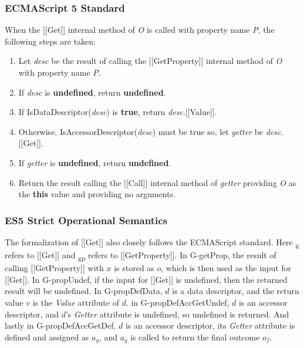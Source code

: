 \documentclass[a4paper,11pt,twoside]{report}
\begin{document}
\subsubsection{ECMAScript 5 Standard}\label{sec:getstandard}
When the [[Get]] internal method of \textit{O} is called with property name \textit{P}, the following steps are taken:
\begin{enumerate}
\item Let \textit{desc} be the result of calling the [[GetProperty]] internal method of \textit{O} with property name \textit{P}.
\item If \textit{desc} is \textbf{undefined}, return \textbf{undefined}.
\item If IsDataDescriptor(\textit{desc}) is \textbf{true}, return \textit{desc}.[[Value]].
\item Otherwise, IsAccessorDescriptor(\textit{desc}) must be true so, let \textit{getter} be \textit{desc}.[[Get]].
\item If \textit{getter} is \textbf{undefined}, return \textbf{undefined}.
\item Return the result calling the [[Call]] internal method of \textit{getter} providing \textit{O} as the \textbf{this} value and providing no arguments.
\end{enumerate}

\subsubsection{ES5 Strict Operational Semantics}
The formalization of [[Get]] also closely follows the ECMAScript standard. Here \textsubscript{g} refers to [[Get]] and \textsubscript{gp} refers to [[GetProperty]]. In G-getProp, the result of calling [[GetProperty]] with $x$ is stored as $o$, which is then used as the input for [[Get]]. In G-propUndef, if the input for [[Get]] is undefined, then the returned result will be undefined. In G-propDefData, $d$ is a data descriptor, and the return value $v$ is the \textit{Value} attribute of $d$. in G-propDefAccGetUndef, $d$ is an accessor descriptor, and $d$'s \textit{Getter} attribute is undefined, so undefined is returned. And lastly in G-propDefAccGetDef, $d$ is an accessor descriptor, its \textit{Getter} attribute is defined and assigned as $a_g$, and $a_g$ is called to return the final outcome $o_f$.
\end{document}

